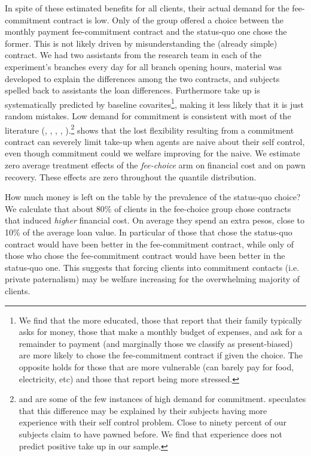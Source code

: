 \documentclass[11pt]{article}
\begin{document}
In spite of these estimated benefits for all clients, their actual demand for the fee-commitment contract is low. Only  of the group offered a choice between the monthly payment fee-commitment contract and the status-quo one chose the former. This is not likely driven by misunderstanding the (already simple) contract. We had two assistants from the research team in each of the experiment's branches every day for all branch opening hours, material was developed to explain the differences among the two contracts, and subjects spelled back to assistants the loan differences. Furthermore take up is systematically predicted by baseline covarites\footnote{We find that the more educated, those that report that their family typically asks for money, those that make a monthly budget of expenses, and ask for a remainder to payment (and marginally those we classify as present-biased) are more likely to chose the fee-commitment contract if given the choice. The opposite holds for those that are more vulnerable (can barely pay for food, electricity, etc) and those that report being more stressed.}, making it less likely that it is just random mistakes. Low demand for commitment is consistent with most of the literature (\cite{Laibson2015}, \cite{Laibson2018}, \cite{John}, \cite{Ted}, \cite{Rabin2018}).\footnote{\cite{Alcohol} and \cite{Kremer} are some of the few instances of high demand for commitment. \cite{Alcohol} speculates that this difference may be explained by their subjects having more experience with their self control problem. Close to ninety percent of our subjects claim to have pawned before. We find that experience does not predict positive take up in our sample.} \cite{Laibson2015} shows that the lost flexibility resulting from a commitment contract can severely limit take-up when agents are naive about their self control, even though commitment could we welfare improving for the naive. We estimate zero average treatment effects of the \textit{fee-choice} arm on financial cost and on pawn recovery. These effects are zero throughout the quantile distribution.


How much money is left on the table by the prevalence of the status-quo choice? We calculate that about 80\% of clients in the fee-choice group chose contracts that induced \textit{higher} financial cost. On average they spend an extra  pesos, close to 10\% of the average loan value. In particular  of those that chose the status-quo contract would have been better in the fee-commitment contract, while only  of those who chose the fee-commitment contract would have been better in the status-quo one. This suggests that forcing clients into commitment contacts (i.e. private paternalism) may be welfare increasing for the overwhelming majority of clients.  
\end{document}
